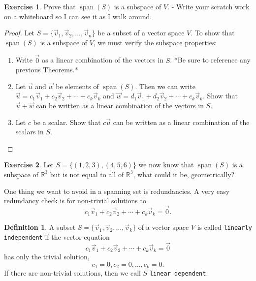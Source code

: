 \documentclass{beamer}
\newcommand{\R}{\mathbb{R}}
\newcommand{\fn}{\insertframenumber}
\theoremstyle{definition}
\newtheorem{exercise}{Exercise}
\newtheorem*{defn}{Definition}
\renewcommand{\emph}[1]{{\color{blue}\texttt{#1}}}
\begin{document}
\begin{frame}{\fn}	
	\begin{exercise}
		Prove that $\operatorname{span}(S)$ is a subspace of $V$. - Write your scratch work on a whiteboard so I can see it as I walk around.
		\begin{proof}
			Let $S=\{\vec v_1,\vec v_2,\dots,\vec v_n\}$ be a subset of a vector space $V$. To show that $\operatorname{span}(S)$ is a subspace of $V$, we must verify the subspace properties:
			\begin{enumerate}[label=(\alph*)]
				\item Write $\vec 0$ as a linear combination of the vectors in $S$. *Be sure to reference any previous Theorems.*
				\item Let $\vec u$ and $\vec w$ be elements of $\operatorname{span}(S)$.  Then we can write $\vec u=c_1\vec v_1+c_2\vec v_2+\cdots+c_k\vec v_k$ and $\vec w=d_1\vec v_1+d_2\vec v_2+\cdots +c_k\vec v_k$.  Show that $\vec u+\vec w$ can be written as a linear combination of the vectors in $S$.
				\item Let $c$ be a scalar.  Show that $c\vec u$ can be written as a linear combination of the scalars in $S$.
			\end{enumerate}
		\end{proof}
	\end{exercise}
\end{frame}
\begin{frame}{\fn}
	\begin{exercise}
		Let $S=\{(1,2,3),(4,5,6)\}$ we now know that $\operatorname{span}(S)$ is a subspace of $\R^3$ but is not equal to all of $\R^3$, what could it be, geometrically?
	\end{exercise}
\end{frame}
\begin{frame}{\fn}
	One thing we want to avoid in a spanning set is redundancies. A very easy redundancy check is for non-trivial solutions to
		\[c_1\vec v_1+c_2\vec v_2+\cdots + c_k\vec v_k=\vec 0.\]
	\begin{defn}
		A subset $S=\{\vec v_1,\vec v_2,\dots,\vec v_k\}$ of a vector space $V$ is called \emph{linearly independent} if the vector equation
			\[c_1\vec v_1+c_2\vec v_2+\cdots+c_k\vec v_k=\vec 0\]
		has only the trivial solution,
			\[c_1=0,c_2=0,\dots,c_k=0.\]
		If there are non-trivial solutions, then we call $S$ \emph{linear dependent}.
	\end{defn}
\end{frame}
\end{document}
